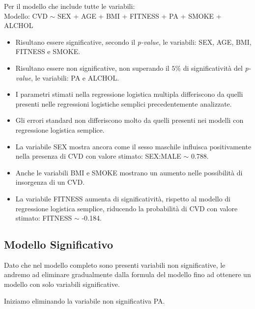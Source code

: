 \documentclass{article}\usepackage[]{graphicx}\usepackage[]{xcolor}
\begin{document}
    Per il modello che include tutte le variabili:\\
    Modello: CVD $\sim$ SEX + AGE + BMI + FITNESS + PA + SMOKE + ALCHOL 
    \begin{itemize}
      \item Risultano essere significative, secondo il \emph{p-value}, le 
            variabili: SEX, AGE, BMI, FITNESS e SMOKE.
      \item Risultano essere non significative, non superando il $5\%$
            di significatività del \emph{p-value}, le variabili: PA e ALCHOL.
      \item I parametri stimati nella regressione logistica multipla differiscono
            da quelli presenti nelle regressioni logistiche semplici precedentemente
            analizzate.
      \item Gli errori standard non differiscono molto da quelli presenti nei
            modelli con regressione logistica semplice.
      \item La variabile SEX mostra ancora come il sesso maschile influisca 
            positivamente nella presenza di CVD con valore stimato: 
            SEX:MALE $\sim$ 0.788.
      \item Anche le variabili BMI e SMOKE mostrano un aumento nelle possibilità 
            di insorgenza di un CVD.
      \item La variabile FITNESS aumenta di significatività, rispetto
            al modello di regressione logistica semplice, riducendo la 
            probabilità di CVD con valore stimato: FITNESS $\sim$ -0.184.
    \end{itemize}
  
  \subsection{Modello Significativo}
    Dato che nel modello completo sono presenti variabili non significative,
    le andremo ad eliminare gradualmente dalla formula del modello fino ad 
    ottenere un modello con solo variabili significative.\par
    Iniziamo eliminando la variabile non significativa PA.
    
\end{document}
